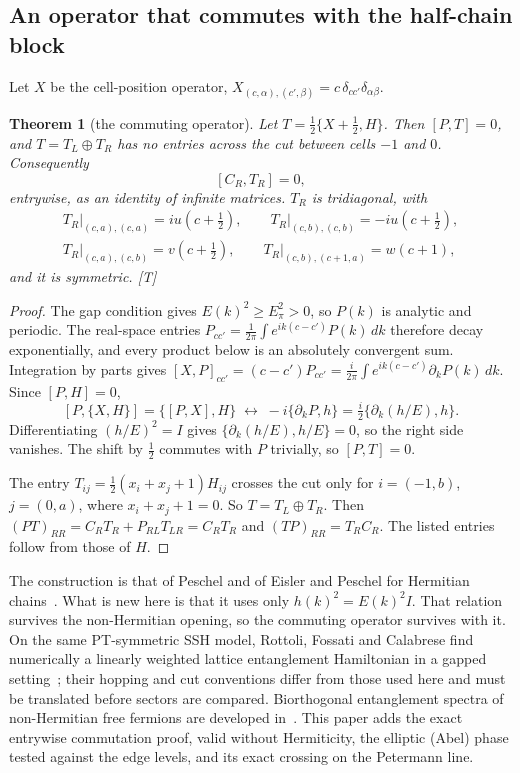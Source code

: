 \documentclass[11pt]{article}
\newtheorem{theorem}{Theorem}[section]
\theoremstyle{definition}
\newcommand{\grade}[1]{\textsf{\small[#1]}}
\begin{document}
\subsection{An operator that commutes with the half-chain block}
Let $X$ be the cell-position operator, $X_{(c,\alpha),(c',\beta)}=c\,\delta_{cc'}\delta_{\alpha\beta}$.
\begin{theorem}[the commuting operator]\label{thm:commute}
Let $T=\tfrac12\{X+\tfrac12,H\}$. Then $[P,T]=0$, and $T=T_L\oplus T_R$ has no entries across the cut between cells $-1$ and $0$. Consequently
\[
[C_R,T_R]=0,
\]
entrywise, as an identity of infinite matrices. $T_R$ is tridiagonal, with
\begin{gather*}
T_R\big|_{(c,a),(c,a)}=iu(c+\tfrac12),\qquad T_R\big|_{(c,b),(c,b)}=-iu(c+\tfrac12),\\
T_R\big|_{(c,a),(c,b)}=v(c+\tfrac12),\qquad T_R\big|_{(c,b),(c+1,a)}=w(c+1),
\end{gather*}
and it is symmetric. \grade{T}
\end{theorem}
\begin{proof}
The gap condition gives $E(k)^2\ge E_\pi^2>0$, so $P(k)$ is analytic and periodic. The real-space entries $P_{cc'}=\frac1{2\pi}\int e^{ik(c-c')}P(k)\,dk$ therefore decay exponentially, and every product below is an absolutely convergent sum. Integration by parts gives $[X,P]_{cc'}=(c-c')P_{cc'}=\frac{i}{2\pi}\int e^{ik(c-c')}\partial_kP(k)\,dk$. Since $[P,H]=0$,
\[
[P,\{X,H\}]=\{[P,X],H\}\;\longleftrightarrow\;-i\{\partial_kP,h\}=\tfrac i2\{\partial_k(h/E),h\}.
\]
Differentiating $(h/E)^2=I$ gives $\{\partial_k(h/E),h/E\}=0$, so the right side vanishes. The shift by $\tfrac12$ commutes with $P$ trivially, so $[P,T]=0$.

The entry $T_{ij}=\tfrac12(x_i+x_j+1)H_{ij}$ crosses the cut only for $i=(-1,b)$, $j=(0,a)$, where $x_i+x_j+1=0$. So $T=T_L\oplus T_R$. Then $(PT)_{RR}=C_RT_R+P_{RL}T_{LR}=C_RT_R$ and $(TP)_{RR}=T_RC_R$. The listed entries follow from those of $H$.
\end{proof}
The construction is that of Peschel and of Eisler and Peschel for Hermitian chains~\cite{peschel03,peschel04,eislerpeschel13,eislerpeschel17}. What is new here is that it uses only $h(k)^2=E(k)^2I$. That relation survives the non-Hermitian opening, so the commuting operator survives with it. On the same PT-symmetric SSH model, Rottoli, Fossati and Calabrese find numerically a linearly weighted lattice entanglement Hamiltonian in a gapped setting~\cite{rottoli24}; their hopping and cut conventions differ from those used here and must be translated before sectors are compared. Biorthogonal entanglement spectra of non-Hermitian free fermions are developed in~\cite{chang20,herviou19}. This paper adds the exact entrywise commutation proof, valid without Hermiticity, the elliptic (Abel) phase tested against the edge levels, and its exact crossing on the Petermann line.
\end{document}

